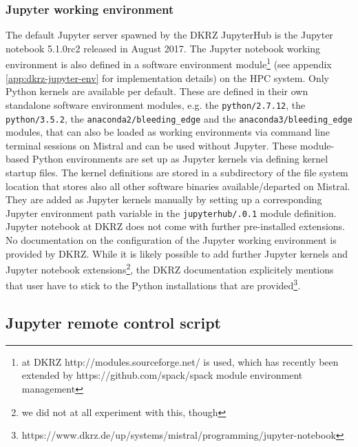 \subsubsection{Jupyter working environment}

The default Jupyter server spawned by the DKRZ JupyterHub is the Jupyter notebook 5.1.0rc2 released in August 2017.
The Jupyter notebook working environment is also defined in a software environment module\footnote{at DKRZ http://modules.sourceforge.net/ is used, which has recently been extended by https://github.com/spack/spack module environment management} (see appendix \ref{app:dkrz-jupyter-env} for implementation details) on the HPC system.
Only Python kernels are available per default.
These are defined in their own standalone software environment modules, e.g. the \verb|python/2.7.12|, the \verb|python/3.5.2|, the \verb|anaconda2/bleeding_edge| and the \verb|anaconda3/bleeding_edge| modules, that can also be loaded as working environments via command line terminal sessions on Mistral and can be used without Jupyter.
These module-based Python environments are set up as Jupyter kernels via defining kernel startup files.
The kernel definitions are stored in a subdirectory of the file system location that stores also all other software binaries available/departed on Mistral.
They are added as Jupyter kernels manually by setting up a corresponding Jupyter environment path variable in the {\tt jupyterhub/.0.1} module definition.
Jupyter notebook at DKRZ does not come with further pre-installed extensions.
No documentation on the configuration of the Jupyter working environment is provided by DKRZ.
While it is likely possible to add further Jupyter kernels and Jupyter notebook extensions\footnote{we did not at all experiment with this, though}, the DKRZ documentation explicitely mentions that user have to stick to the Python installations that are provided\footnote{https://www.dkrz.de/up/systems/mistral/programming/jupyter-notebook}.

\subsection{Jupyter remote control script}

